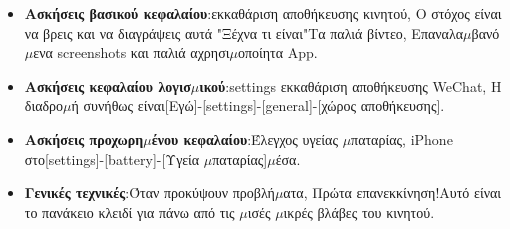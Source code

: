 
\begin{itemize}
  \item \textbf{Ασκήσεις βασικού κεφαλαίου}:εκκαθάριση αποθήκευσης κινητού, Ο στόχος είναι να βρεις και να διαγράψεις αυτά "Ξέχνα τι είναι"Τα παλιά βίντεο, Επαναλα$\mu$βανό$\mu$ενα screenshots και παλιά αχρησι$\mu$οποίητα App.
  \item \textbf{Ασκήσεις κεφαλαίου λογισ$\mu$ικού}:settings εκκαθάριση αποθήκευσης WeChat, Η διαδρο$\mu$ή συνήθως είναι[Εγώ]-[settings]-[general]-[χώρος αποθήκευσης].
  \item \textbf{Ασκήσεις προχωρη$\mu$ένου κεφαλαίου}:Έλεγχος υγείας $\mu$παταρίας, iPhone στο[settings]-[battery]-[Υγεία $\mu$παταρίας]$\mu$έσα.
  \item \textbf{Γενικές τεχνικές}:Όταν προκύψουν προβλή$\mu$ατα, Πρώτα επανεκκίνηση!Αυτό είναι το πανάκειο κλειδί για πάνω από τις $\mu$ισές $\mu$ικρές βλάβες του κινητού.
\end{itemize}
